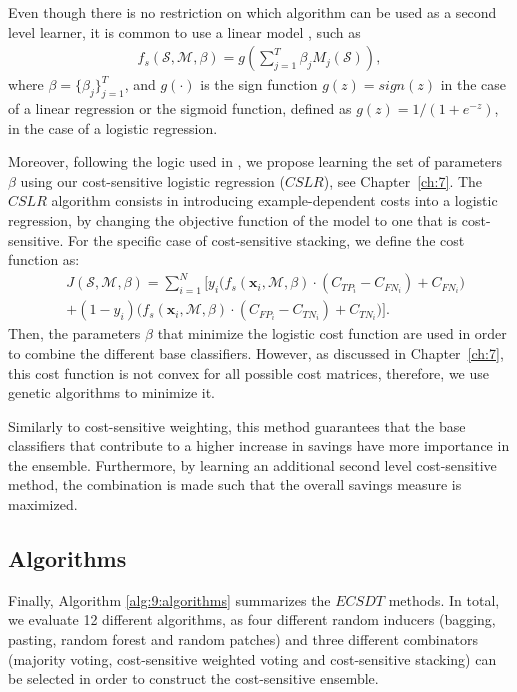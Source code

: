 {Even though there is no restriction on which algorithm can be used as a second level learner, 
it is common to use a linear model \citep{Zhou2012}, such as 
\begin{align}
  f_s(\mathcal{S},\mathcal{M},\beta) =
  g \left( \sum_{j=1}^T \beta_j M_j(\mathcal{S}) \right),
\end{align}
where $\beta=\{\beta_j\}_{j=1}^T$, and $g(\cdot)$ is the sign function 
\mbox{$g(z)=sign(z)$} in the case of a linear regression or the sigmoid function, defined 
as \mbox{$g(z)=1/(1+e^{-z})$}, in the case of a logistic regression. 

Moreover, following the logic used in \citep{Nesbitt2010}, we propose learning the set of  
parameters $\beta$  using our cost-sensitive logistic regression ($CSLR$), see Chapter~\ref{ch:7}. 
The $CSLR$ algorithm consists in introducing example-dependent costs into a logistic regression, by 
changing the objective function of the model to one that is cost-sensitive. For the specific case of 
cost-sensitive stacking, we define the cost function as: 
\begin{align}
  &J(\mathcal{S},\mathcal{M},\beta)= 
  \sum_{i=1}^{N} \bigg[ y_i\bigg( 
  f_s(\mathbf{x}_i,\mathcal{M},\beta) \cdot(C_{TP_i} - C_{FN_i}) + C_{FN_i} \bigg) 
  \nonumber \\
  & + (1-y_i)\bigg( f_s(\mathbf{x}_i,\mathcal{M},\beta) \cdot(C_{FP_i} - C_{TN_i}) 
    +C_{TN_i} \bigg) \bigg].
\end{align}
Then, the parameters $\beta$ that minimize the logistic cost function are used in order to 
combine the different base classifiers. However, as discussed in Chapter~\ref{ch:7}, 
this cost function is not convex for all possible cost matrices, therefore, we use genetic 
algorithms to minimize it.

Similarly to cost-sensitive weighting, this method guarantees that the base classifiers that 
contribute to a higher increase in savings have more importance in the ensemble. Furthermore, 
by learning an additional second level cost-sensitive method, the combination is made such that 
the overall   savings measure is maximized.


\subsection{Algorithms}

Finally, Algorithm \ref{alg:9:algorithms} summarizes the $ECSDT$ methods. In total, we   
evaluate 12 different algorithms, as four different random inducers (bagging, pasting, random 
forest and random patches) and three different combinators (majority voting, cost-sensitive 
weighted voting and cost-sensitive stacking) can be selected in order to construct the 
cost-sensitive ensemble.
  

}
